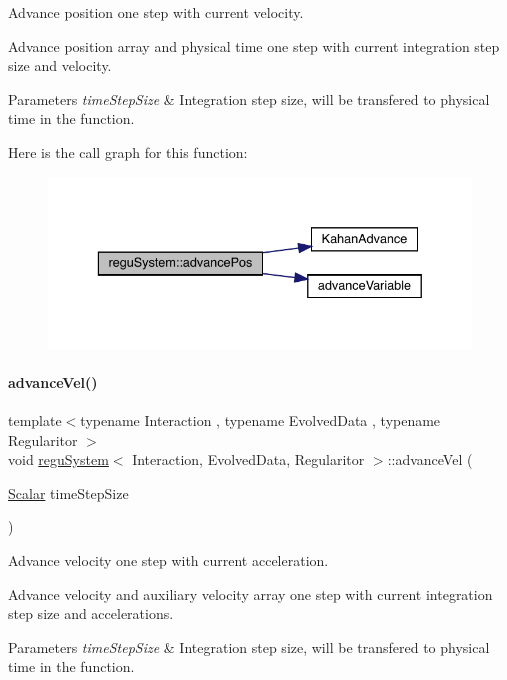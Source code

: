 Advance position one step with current velocity. 

Advance position array and physical time one step with current integration step size and velocity. 
\begin{DoxyParams}{Parameters}
{\em time\+Step\+Size} & Integration step size, will be transfered to physical time in the function. \\
\hline
\end{DoxyParams}
Here is the call graph for this function\+:\nopagebreak
\begin{figure}[H]
\begin{center}
\leavevmode
\includegraphics[width=336pt]{classregu_system_ab1964e22d3d7f6ddaa51c5e7a02534a5_cgraph}
\end{center}
\end{figure}
\mbox{\label{classregu_system_ae00564e4aceeec7ce3a8aa6a158aa53e}} 
\paragraph{\texorpdfstring{advance\+Vel()}{advanceVel()}}
{\footnotesize\ttfamily template$<$typename Interaction , typename Evolved\+Data , typename Regularitor $>$ \\
void \mbox{\hyperlink{classregu_system}{regu\+System}}$<$ Interaction, Evolved\+Data, Regularitor $>$\+::advance\+Vel (\begin{DoxyParamCaption}\item[{\mbox{\hyperlink{classregu_system_aca8ee2c387943164ee3ea68370fc3ac0}{Scalar}}}]{time\+Step\+Size }\end{DoxyParamCaption})}



Advance velocity one step with current acceleration. 

Advance velocity and auxiliary velocity array one step with current integration step size and accelerations. 
\begin{DoxyParams}{Parameters}
{\em time\+Step\+Size} & Integration step size, will be transfered to physical time in the function. \\
\hline
\end{DoxyParams}
\mbox{\label{classregu_system_a53e1d725a1df2b65029f622a17364b1e}} 
